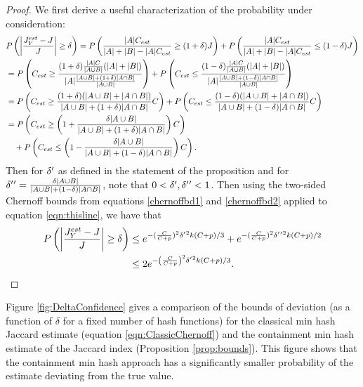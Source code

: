 \documentclass[11pt,reqno]{amsart}
\theoremstyle{remark}
\numberwithin{equation}{section}
\newcommand{\containX}{Y}
\begin{document}
\begin{proof}
We first derive a useful characterization of the probability under consideration:
\begin{align}
&P\left(\left|\frac{J_\containX^{est}-J}{J}\right|\geq \delta\right) %
= P\left(\frac{|A| C_{est}}{|A|+|B|-|A| C_{est}}\geq (1+\delta)J\right)+P\left(\frac{|A| C_{est}}{|A|+|B|-|A| C_{est}}\leq (1-\delta)J\right) \notag\\
&= P\left(C_{est}\geq\frac{ (1+\delta)\frac{|A|C}{|A\cup B|}(|A|+|B|)}{|A|\frac{|A\cup B|+(1+\delta)|A \cap B|}{|A\cup B|}} \right)+P\left(C_{est}\leq\frac{ (1-\delta)\frac{|A|C}{|A\cup B|}(|A|+|B|)}{|A|\frac{|A\cup B|+(1-\delta)|A \cap B|}{|A\cup B|}} \right)\notag\\
&= P\left(C_{est}\geq\frac{ (1+\delta)(|A \cup B|+|A \cap B|)}{|A\cup B|+(1+\delta)|A \cap B|} C \right)+P\left(C_{est}\leq\frac{ (1-\delta)(|A \cup B|+|A \cap B|)}{|A\cup B|+(1-\delta)|A \cap B|} C \right)\notag\\
&= P\left(C_{est}\geq\left(1+\frac{\delta |A \cup B|}{|A\cup B|+(1+\delta)|A \cap B|}\right) C \right)\notag\\
&\quad +P\left(C_{est}\leq\left(1-\frac{ \delta |A \cup B|}{|A\cup B|+(1-\delta)|A \cap B|}\right) C \right). \label{eqn:thisline}
\end{align}
Then for $\delta\rq{}$ as defined in the statement of the proposition and for $\delta\rq{}\rq{}=\frac{\delta |A \cup B|}{|A\cup B|+(1-\delta)|A \cap B|}$, note that $0<\delta\rq{}, \delta\rq{}\rq{}<1$. Then using the two-sided Chernoff bounds from equations \eqref{chernoffbd1} and \eqref{chernoffbd2} applied to equation \eqref{eqn:thisline}, we have that
\begin{align*}
P\left(\left|\frac{J_\containX^{est}-J}{J}\right|\geq \delta\right) &\leq e^{-(\frac{C}{C+p})^2\delta\rq{}^2k(C+p)/3}+e^{-(\frac{C}{C+p})^2\delta\rq{}\rq{}^2k(C+p)/2}\\
&\leq 2e^{-\left(\frac{C}{C+p}\right)^2\delta\rq{}^2k(C+p)/3}.
\end{align*}
\end{proof}
 Figure \ref{fig:DeltaConfidence} gives a comparison of the bounds of deviation (as a function of $\delta$ for a fixed number of hash functions) for the classical min hash Jaccard estimate (equation \eqref{eqn:ClassicChernoff}) and the containment min hash estimate of the Jaccard index (Proposition \ref{prop:bounds}). This figure shows that the containment min hash approach has a significantly smaller probability of the estimate deviating from the true value. 
\end{document}

